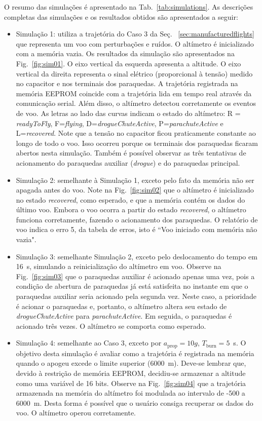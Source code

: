 \documentclass[12pt,a4paper]{article}
\begin{document}
O resumo das simulações é apresentado na Tab.~\ref{tab:simulations}. As descrições completas das simulações e os resultados obtidos são apresentados a seguir:
\begin{itemize}
	\item Simulação 1: utiliza a trajetória do Caso 3 da Seç.~ \ref{sec:manufacturedflights} que representa um voo com perturbações e ruídos. O altímetro é inicializado com a memória vazia. Os resultados da simulação são apresentados na Fig.~\ref{fig:sim01}. O eixo vertical da esquerda apresenta a altitude. O eixo vertical da direita representa o sinal elétrico (proporcional à tensão) medido no capacitor e nos terminais dos paraquedas. A trajetória registrada na memória EEPROM coincide com a trajetória lida em tempo real através da comunicação serial. Além disso, o altímetro detectou corretamente os eventos de voo. As letras ao lado das curvas indicam o estado do altímetro: R = \textit{readyToFly}, F=\textit{flying}, D=\textit{drogueChuteActive}, P=\textit{parachuteActive} e L=\textit{recovered}. Note que a tensão no capacitor ficou praticamente constante ao longo de todo o voo. Isso ocorreu porque os terminais dos paraquedas ficaram abertos nesta simulação. Também é possível observar as três tentativas de acionamento do paraquedas auxiliar (\textit{drogue}) e do paraquedas principal.
	\item Simulação 2: semelhante à Simulação 1, exceto pelo fato da memória não ser apagada antes do voo. Note na Fig.~\ref{fig:sim02} que o altímetro é inicializado no estado \textit{recovered}, como esperado, e que a memória contém os dados do último voo. Embora o voo ocorra a partir do estado \textit{recovered}, o altímetro funciona corretamente, fazendo o acionamento dos paraquedas. O relatório de voo indica o erro 5, da tabela de erros, isto é ``Voo iniciado com memória não vazia".
	\item Simulação 3: semelhante Simulação 2, exceto pelo deslocamento do tempo em 16~s, simulando a reinicialização do altímetro em voo. Observe na Fig.~\ref{fig:sim03} que o paraquedas auxiliar é acionado apenas uma vez, pois a condição de abertura de paraquedas já está satisfeita no instante em que o paraquedas auxiliar seria acionado pela segunda vez. Neste caso, a prioridade é acionar o paraquedas e, portanto, o altímetro altera seu estado de \textit{drogueChuteActive} para \textit{parachuteActive}. Em seguida, o paraquedas é acionado três vezes. O altímetro se comporta como esperado. 
	\item Simulação 4: semelhante ao Caso 3, exceto por $a_\text{prop}=10g$, $T_\text{burn}=5$~s. O objetivo desta simulação é avaliar como a trajetória é registrada na memória quando o apogeu excede o limite superior (6000~m). Deve-se lembrar que, devido à restrição de memória EEPROM, decidiu-se armazenar a altitude como uma variável de 16 bits. Observe na Fig.~\ref{fig:sim04} que a trajetória armazenada na memória do altímetro foi modulada ao intervalo de -500 a 6000~m. Desta forma é possível que o usuário consiga recuperar os dados do voo. O altímetro operou corretamente.

\end{itemize}
\end{document}
